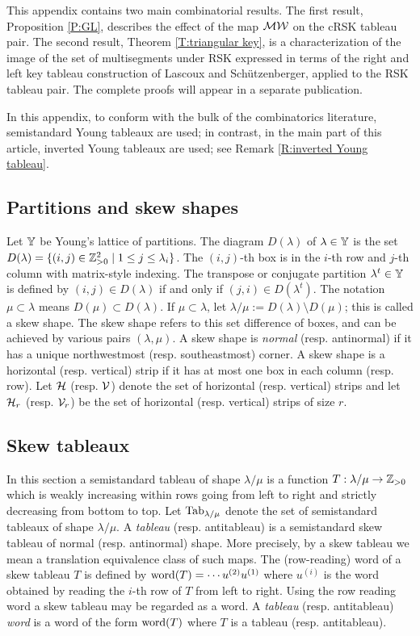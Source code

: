 \documentclass{ert-l} %
\begin{document}
	
This appendix contains two main combinatorial results.
The first result, Proposition \ref{P:GL}, describes the effect of the map $\mathcal{MW}$ on the cRSK tableau pair.
The second result, Theorem \ref{T:triangular key}, is a characterization of the image of the set of multisegments under RSK expressed in terms of the right and left key tableau construction of Lascoux and Sch\"utzenberger, applied to the RSK tableau pair.
The complete proofs will appear in a separate publication.

In this appendix, to conform with the bulk of the combinatorics literature, semistandard Young tableaux are used; in contrast, in the main part of this article, inverted Young tableaux
are used; see Remark \ref{R:inverted Young tableau}.

\subsection{Partitions and skew shapes}\label{sec: shapes}
Let $\mathbb{Y}$ be Young's lattice of partitions.
The diagram $D(\lambda)$ of $\lambda\in\mathbb{Y}$ is the set $D(\lambda)=\{(i,j)\in\mathbb{Z}_{>0}^2\mid 1\le j\le\lambda_i\}$. The $(i,j)$-th box is in the $i$-th row and $j$-th column with matrix-style indexing. The transpose or conjugate partition $\lambda^t\in\mathbb{Y}$ is defined by $(i,j)\in D(\lambda)$ if and only if $(j,i)\in D(\lambda^t)$. The notation $\mu\subset\lambda$ means $D(\mu)\subset D(\lambda)$. If $\mu\subset\lambda$, let
$\lambda/\mu:=D(\lambda)\setminus D(\mu)$; this is called a skew shape. The skew shape refers to this set difference of boxes, and can be achieved by various pairs $(\lambda,\mu)$.
A skew shape is \textit{normal} (resp. antinormal) if it has a unique northwestmost (resp. southeastmost) corner.
A skew shape is a horizontal (resp. vertical) strip if it has at most one box in each column (resp. row). Let $\mathcal{H}$ (resp. $\mathcal{V}$) denote the set of horizontal (resp. vertical) strips and let $\mathcal{H}_r$ (resp. $\mathcal{V}_r$) be the set of horizontal (resp. vertical) strips of size $r$.

\subsection{Skew tableaux}
In this section a semistandard tableau of shape $\lambda/\mu$ is a function $T:\lambda/\mu\to\mathbb{Z}_{>0}$ which is weakly increasing within rows going from left to right and strictly decreasing from bottom to top. Let $\mathrm{Tab}_{\lambda/\mu}$ denote the set of semistandard tableaux of shape $\lambda/\mu$.
A \textit{tableau} (resp. antitableau) is a semistandard skew tableau of normal (resp. antinormal) shape. More precisely, by a skew tableau we mean a translation equivalence class of such maps.
The (row-reading) word of a skew tableau $T$ is defined by
$\mathrm{word}(T) = \dotsm u^{(2)} u^{(1)}$ where $u^{(i)}$ is the word obtained by reading the $i$-th row of $T$ from left to right. Using the row reading word a skew tableau may be regarded as a word. A \textit{tableau} (resp. antitableau) \textit{word} is a word of the form $\mathrm{word}(T)$ where $T$ is a tableau (resp. antitableau).
\end{document}

